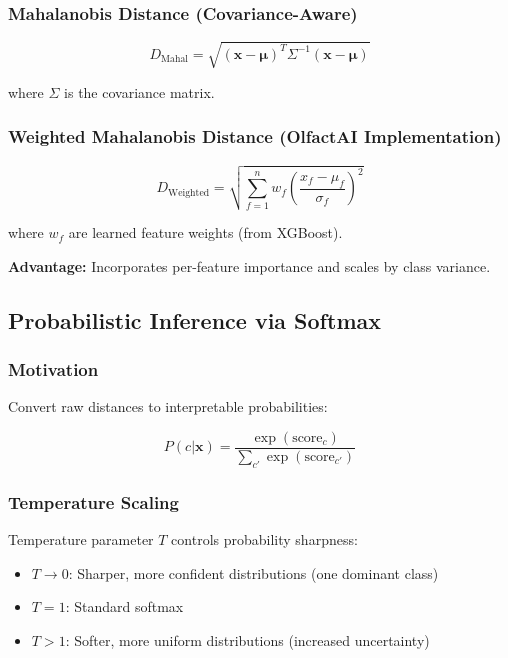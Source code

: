 \documentclass[10pt]{article}
\begin{document}
{\subsubsection{Mahalanobis Distance (Covariance-Aware)}

\begin{equation}
D_{\text{Mahal}} = \sqrt{(\mathbf{x} - \boldsymbol{\mu})^T \Sigma^{-1} (\mathbf{x} - \boldsymbol{\mu})}
\end{equation}

where $\Sigma$ is the covariance matrix.

\subsubsection{Weighted Mahalanobis Distance (OlfactAI Implementation)}

\begin{equation}
D_{\text{Weighted}} = \sqrt{\sum_{f=1}^{n} w_f \left(\frac{x_f - \mu_f}{\sigma_f}\right)^2}
\end{equation}

where $w_f$ are learned feature weights (from XGBoost).

\textbf{Advantage:} Incorporates per-feature importance and scales by class variance.

\subsection{Probabilistic Inference via Softmax}

\subsubsection{Motivation}

Convert raw distances to interpretable probabilities:

\begin{equation}
P(c|\mathbf{x}) = \frac{\exp(\text{score}_c)}{\sum_{c'} \exp(\text{score}_{c'})}
\end{equation}

\subsubsection{Temperature Scaling}

Temperature parameter $T$ controls probability sharpness:

\begin{itemize}
    \item $T \to 0$: Sharper, more confident distributions (one dominant class)
    \item $T = 1$: Standard softmax
    \item $T > 1$: Softer, more uniform distributions (increased uncertainty)
\end{itemize}

}
\end{document}
